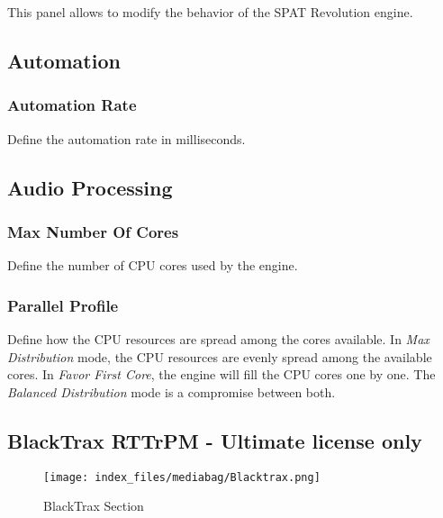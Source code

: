 \documentclass[
  letterpaper,
  DIV=11,
  numbers=noendperiod]{scrreport}
\begin{document}
This panel allows to modify the behavior of the SPAT Revolution engine.

\hypertarget{automation}{%
\subsection{Automation}\label{automation}}

\hypertarget{automation-rate}{%
\subsubsection{Automation Rate}\label{automation-rate}}

Define the automation rate in milliseconds.

\hypertarget{audio-processing}{%
\subsection{Audio Processing}\label{audio-processing}}

\hypertarget{max-number-of-cores}{%
\subsubsection{Max Number Of Cores}\label{max-number-of-cores}}

Define the number of CPU cores used by the engine.

\hypertarget{parallel-profile}{%
\subsubsection{Parallel Profile}\label{parallel-profile}}

Define how the CPU resources are spread among the cores available. In
\emph{Max Distribution} mode, the CPU resources are evenly spread among
the available cores. In \emph{Favor First Core}, the engine will fill
the CPU cores one by one. The \emph{Balanced Distribution} mode is a
compromise between both.

\hypertarget{blacktrax-rttrpm---ultimate-license-only}{%
\subsection{BlackTrax RTTrPM - Ultimate license
only}\label{blacktrax-rttrpm---ultimate-license-only}}

\begin{figure}

{\centering \texttt{[image: index\_files/mediabag/Blacktrax.png]}

}

\caption{BlackTrax Section}

\end{figure}
\end{document}
